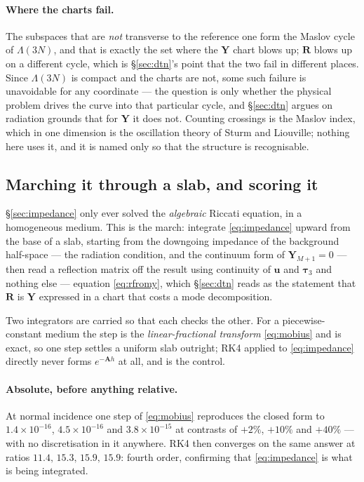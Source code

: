 \documentclass[11pt,a4paper]{article}
\newcommand{\bA}{\mathbf{A}}
\newcommand{\bu}{\mathbf{u}}
\newcommand{\bta}{\boldsymbol{\tau}}
\newcommand{\bR}{\mathbf{R}}
\newcommand{\bY}{\mathbf{Y}}
\begin{document}
\paragraph{Where the charts fail.}  The subspaces that are \emph{not} transverse
to the reference one form the Maslov cycle of $\Lambda(3N)$, and that is exactly
the set where the $\bY$ chart blows up; $\bR$ blows up on a different cycle,
which is \S\ref{sec:dtn}'s point that the two fail in different places.  Since
$\Lambda(3N)$ is compact and the charts are not, some such failure is
unavoidable for any coordinate --- the question is only whether the physical
problem drives the curve into that particular cycle, and \S\ref{sec:dtn} argues
on radiation grounds that for $\bY$ it does not.  Counting crossings is the
Maslov index, which in one dimension is the oscillation theory of Sturm and
Liouville; nothing here uses it, and it is named only so that the structure is
recognisable.

\subsection{Marching it through a slab, and scoring
it}\label{sec:impmarch}

\S\ref{sec:impedance} only ever solved the \emph{algebraic} Riccati equation, in
a homogeneous medium.  This is the march: integrate \eqref{eq:impedance} upward
from the base of a slab, starting from the downgoing impedance of the background
half-space --- the radiation condition, and the continuum form of
$\mathbf{Y}_{M+1}=0$ --- then read a reflection matrix off the result using
continuity of $\bu$ and $\bta_3$ and nothing else --- equation
\eqref{eq:rfromy}, which \S\ref{sec:dtn} reads as the statement that $\bR$ is
$\bY$ expressed in a chart that costs a mode decomposition.

Two integrators are carried so that each checks the other.  For a
piecewise-constant medium the step is the \emph{linear-fractional transform}
\eqref{eq:mobius} and is exact, so one step settles a uniform slab outright; RK4 applied to
\eqref{eq:impedance} directly never forms $e^{-\bA h}$ at all, and is the
control.

\paragraph{Absolute, before anything relative.}  At normal incidence one step of
\eqref{eq:mobius} reproduces the closed form to $1.4\times10^{-16}$,
$4.5\times10^{-16}$ and $3.8\times10^{-15}$ at contrasts of $+2\%$, $+10\%$ and
$+40\%$ --- with no discretisation in it anywhere.  RK4 then converges on the
same answer at ratios $11.4,\,15.3,\,15.9,\,15.9$: fourth order, confirming that
\eqref{eq:impedance} is what is being integrated.
\end{document}
